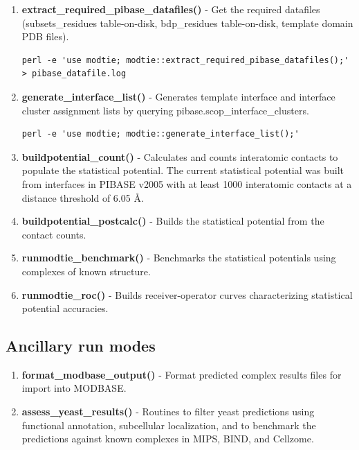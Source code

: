 \documentclass[11pt]{article}
\begin{document}
\begin{enumerate}

\item {\bf extract\_required\_pibase\_datafiles()} - Get the required datafiles (subsets\_residues table-on-disk, bdp\_residues table-on-disk, template domain PDB files).

\begin{verbatim}
perl -e 'use modtie; modtie::extract_required_pibase_datafiles();' > pibase_datafile.log
\end{verbatim}

\item {\bf generate\_interface\_list()} - Generates template interface and interface cluster assignment lists by querying pibase.scop\_interface\_clusters.

\begin{verbatim}
perl -e 'use modtie; modtie::generate_interface_list();'
\end{verbatim}

\item {\bf buildpotential\_count()} - Calculates and counts interatomic contacts to populate the statistical potential. The current statistical potential was built from interfaces in PIBASE v2005 with at least 1000 interatomic contacts at a distance threshold of 6.05 \AA.

\item {\bf buildpotential\_postcalc()} - Builds the statistical potential from the contact counts.

\item {\bf runmodtie\_benchmark()} - Benchmarks the statistical potentials using complexes of known structure.

\item {\bf runmodtie\_roc()} - Builds receiver-operator curves characterizing statistical potential accuracies.

\end{enumerate}

\subsection{Ancillary run modes}

\begin{enumerate}

\item {\bf format\_modbase\_output()} - Format predicted complex results files for import into MODBASE.

\item {\bf assess\_yeast\_results()} - Routines to filter yeast predictions using functional annotation, subcellular localization, and to benchmark the predictions against known complexes in MIPS, BIND, and Cellzome.

\end{enumerate}
\end{document}
